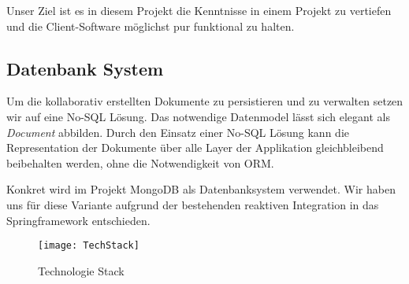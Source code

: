 Unser Ziel ist es in diesem Projekt die Kenntnisse in einem Projekt zu vertiefen und die Client-Software möglichst pur funktional zu halten.


\subsection{Datenbank System}
Um die kollaborativ erstellten Dokumente zu persistieren und zu verwalten setzen wir auf eine No-SQL Lösung.
Das notwendige Datenmodel lässt sich elegant als \emph{Document} abbilden.
Durch den Einsatz einer No-SQL Lösung kann die Representation der Dokumente über alle Layer der Applikation gleichbleibend beibehalten werden,
ohne die Notwendigkeit von ORM\@.

Konkret wird im Projekt MongoDB als Datenbanksystem verwendet.
Wir haben uns für diese Variante aufgrund der bestehenden reaktiven Integration in das Springframework entschieden.


\begin{figure}
    \texttt{[image: TechStack]}
    \caption{Technologie Stack}
\end{figure}
